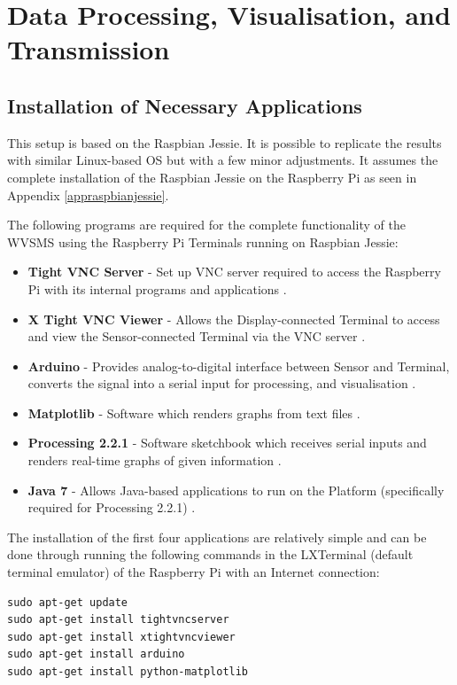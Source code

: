 \chapter{Data Processing, Visualisation, and Transmission} 
\label{processing}

\section{Installation of Necessary Applications}
\label{installation}

This setup is based on the Raspbian Jessie. It is possible to replicate the results with similar Linux-based OS but with a few minor adjustments. It assumes the complete installation of the Raspbian Jessie on the Raspberry Pi as seen in Appendix \ref{appraspbianjessie}. 

The following programs are required for the complete functionality of the WVSMS using the Raspberry Pi Terminals running on Raspbian Jessie: 

\begin{itemize}
	\item \textbf{Tight VNC Server} - Set up VNC server required to access the Raspberry Pi with its internal programs and applications \cite{rpitightvncserver}.
	\item \textbf{X Tight VNC Viewer} - Allows the Display-connected Terminal to access and view the Sensor-connected Terminal via the VNC server	\cite{rpitightvncserver}.
	\item \textbf{Arduino} - Provides analog-to-digital interface between Sensor and Terminal, converts the signal into a serial input for processing, and visualisation \cite{arduino}.
	\item \textbf{Matplotlib} - Software which renders graphs from text files \cite{matplotlib}.
	\item \textbf{Processing 2.2.1} - Software sketchbook which receives serial inputs and renders real-time graphs of given information \cite{processing221}.
	\item \textbf{Java 7} - Allows Java-based applications to run on the Platform (specifically required for Processing 2.2.1) \cite{java7}.
\end{itemize}

The installation of the first four applications are relatively simple and can be done through running the following commands in the LXTerminal (default terminal emulator) of the Raspberry Pi with an Internet connection: 

\begin{lstlisting}
sudo apt-get update
sudo apt-get install tightvncserver
sudo apt-get install xtightvncviewer
sudo apt-get install arduino
sudo apt-get install python-matplotlib
\end{lstlisting}

